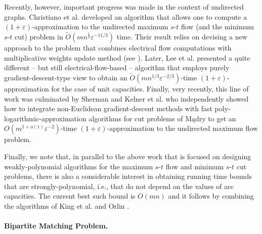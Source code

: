 \documentclass[11pt, letterpaper]{article}
\newcommand{\tO}[1]{\widetilde{O}(#1)}
\newcommand{\eps}{\varepsilon}
\begin{document}
  Recently, however, important progress was made in the context of undirected graphs. Christiano et al. \cite{ChristianoKMST11} developed an algorithm that allows one to compute a $(1+\eps)$-approximation to the undirected maximum $s$-$t$ flow (and the minimum $s$-$t$ cut) problem in $\tO{mn^{\frac{1}{3}} \eps^{-11/3}}$ time. Their result relies on devising a new approach to the problem that combines electrical flow computations with multiplicative weights update method (see \cite{AroraHK05}). Later, Lee et al. \cite{LeeRS13} presented a quite different -- but still electrical-flow-based -- algorithm that employs purely gradient-descent-type view to obtain an $\tO{mn^{1/3}\eps^{-2/3}}$-time $(1+\eps)$-approximation for the case of unit capacities. Finally, very recently, this line of work was culminated by Sherman \cite{Sherman13} and Kelner et al. \cite{KelnerLOS13} who independently showed how to integrate non-Euclidean gradient-descent methods with fast poly-logarithmic-approximation algorithms for cut problems of M\k{a}dry \cite{Madry10b} to get an $O(m^{1+o(1)}\eps^{-2})$-time $(1+\eps)$-approximation to the undirected maximum flow problem. 
  
Finally, we note that, in parallel to the above work that is focused on designing weakly-polynomial algorithms for the maximum $s$-$t$ flow and minimum $s$-$t$ cut problems, there is also a considerable interest in obtaining running time bounds that are strongly-polynomial, i.e., that do not depend on the values of arc capacities. The current best such bound is $O(mn)$ and it follows by combining the algorithms of King et al. \cite{KingRT94} and Orlin \cite{Orlin13}. 
  
  
  
  
  
  
  
  
  \paragraph{Bipartite Matching Problem.}
  
\end{document}
